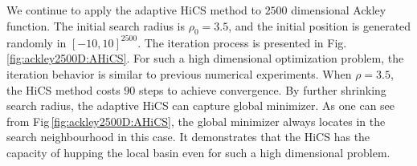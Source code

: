 \documentclass[final,1p,times]{elsarticle}
\begin{document}
%
We continue to apply the adaptive HiCS method to $2500$ dimensional
Ackley function. The initial search radius is $\rho_0=3.5$, and
the initial position is generated randomly in $[-10,10]^{2500}$. 
The iteration process is presented in Fig.\,\ref{fig:ackley2500D:AHiCS}. 
For such a high dimensional optimization problem, the iteration
behavior is similar to previous numerical experiments. 
When $\rho=3.5$, the HiCS method costs $90$ steps to achieve convergence.
By further shrinking search radius, the adaptive HiCS can
capture global minimizer. As one can see from 
Fig\,\ref{fig:ackley2500D:AHiCS}, the global minimizer always
locates in the search neighbourhood in this case. 
It demonstrates that the HiCS has the capacity of hupping the
local basin even for such a high dimensional problem.
\end{document}

